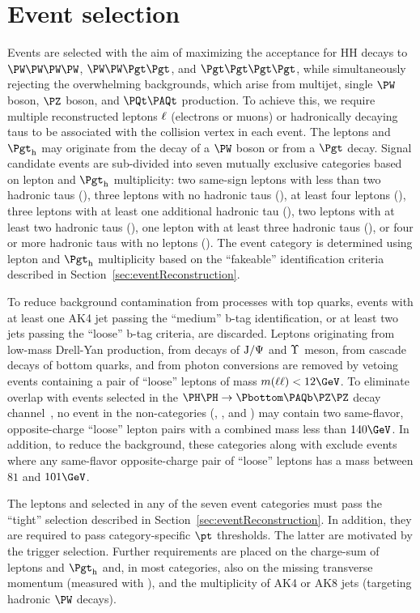 \section{Event selection}
\label{sec:eventSelection}

Events are selected with the aim of maximizing the acceptance for HH decays to $\WWWW$, $\WWtt$, and
$\tttt$, while simultaneously rejecting the overwhelming backgrounds, which arise from multijet, single $\PW$
boson, $\PZ$ boson, and $\ttbar$ production.  To achieve this, we require multiple
reconstructed leptons $\ell$ (electrons or muons) or hadronically decaying taus
\tauh to be associated with the collision vertex in each event.  The leptons and $\tauh$ may originate
from the decay of a $\PW$ boson or from a $\Pgt$ decay.  Signal candidate events
are sub-divided into seven mutually exclusive categories based on lepton and $\tauh$
multiplicity: two same-sign leptons with less than two hadronic taus (\llss),
three leptons with no hadronic taus (\lllnot), at least four leptons (\llll),
three leptons with at least one additional hadronic tau (\lllt), two
leptons with at least two hadronic taus (\lltt), one lepton with at least
three hadronic taus (\lttt), or four or more hadronic taus with no leptons (\noltttt).
The event category is determined using lepton and $\tauh$ multiplicity based on the
``fakeable'' identification criteria described in Section~\ref{sec:eventReconstruction}.

To reduce background contamination from processes with top quarks, events with
at least one AK4 jet passing the ``medium'' b-tag identification, or at least two
jets passing the ``loose'' b-tag criteria, are discarded. 
Leptons originating from low-mass Drell-Yan production, from decays of $\textrm{J}/\Psi$ and $\Upsilon$ meson,
from cascade decays of bottom quarks, and from photon conversions
are removed by vetoing events containing a pair of ``loose'' leptons of mass $m(\leplep) < 12\GeV$.
To eliminate overlap with events selected in the $\HH \to \Pbottom\APbottom\PZ\PZ$ decay channel~\cite{HIG-20-004}, no event in the
non-\tauh categories (\llss, \lllnot, and \llll) may contain two same-flavor,
opposite-charge ``loose'' lepton pairs with a combined mass less than $140\GeV$.
In addition, to reduce the \Zll background, these categories along with
\lltt exclude events where any same-flavor opposite-charge pair of ``loose''
leptons has a mass between $81$ and $101\GeV$.

The leptons and \tauh selected in any of the seven event categories must pass the ``tight'' selection 
described in Section~\ref{sec:eventReconstruction}.
In addition, they are required to pass category-specific $\pt$ thresholds.
The latter are motivated by the trigger selection.
Further requirements are placed on the charge-sum of leptons and $\tauh$
and, in most categories, also on the missing transverse momentum (measured with \metLD), 
and the multiplicity of AK4 or AK8 jets (targeting hadronic $\PW$ decays). 

